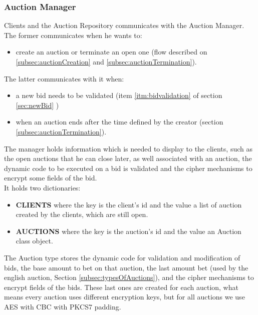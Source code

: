 \documentclass[12pt]{article}
\begin{document}
\subsubsection{Auction Manager}
Clients and the Auction Repository communicates with the Auction Manager. \\
The former communicates when he wants to:
\begin{itemize}
   \item create an auction or terminate an open one (flow described on \ref{subsec:auctionCreation} 
  and \ref{subsec:auctionTermination}). 
\end{itemize}
  The latter communicates with it when:
\begin{itemize}
  \item  a new bid needs to be validated (item \ref{itm:bidvalidation} of section \ref{sec:newBid} )
  \item when an auction ends after the time defined by the creator (section \ref{subsec:auctionTermination}). \\
\end{itemize}
The manager holds information which is needed to display to the clients, such as the open
  auctions that he can close later, as well associated with an auction, the dynamic code
  to be executed on a bid is validated and the cipher mechanisms to encrypt some fields of
  the bid. \\
It holds two dictionaries:
\begin{itemize}
  \item \textbf{CLIENTS} where the key is the client's id and the value a list of auction created by the clients, which are still open.
  \item \textbf{AUCTIONS} where the key is the auction's id  and the value an Auction class object.
\end{itemize}

The Auction type stores the dynamic code for validation and modification of bids, the base amount
  to bet on that auction, the last amount bet (used by the english auction, Section \ref{subsec:typesOfAuctions}), 
  and the cipher mechanisms to encrypt fields of the bids. These last ones are created 
  for each auction, what means every auction uses different encryption keys, but for all auctions
  we use AES with CBC with PKCS7 padding.
\end{document}
